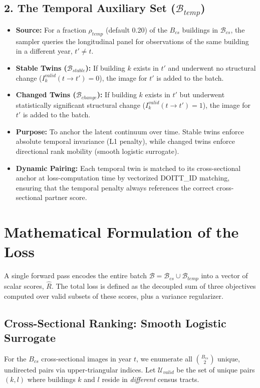 \documentclass[12pt]{article}
\begin{document}
\subsection{2. The Temporal Auxiliary Set ($\mathcal{B}_{temp}$)}
\begin{itemize}
    \item \textbf{Source:} For a fraction $\rho_{temp}$ (default 0.20) of the $B_{cs}$ buildings in $\mathcal{B}_{cs}$, the sampler queries the longitudinal panel for observations of the same building in a different year, $t' \neq t$.
    \item \textbf{Stable Twins ($\mathcal{B}_{stable}$):} If building $k$ exists in $t'$ and underwent no structural change ($I_{k}^{valid}(t \to t') = 0$), the image for $t'$ is added to the batch.
    \item \textbf{Changed Twins ($\mathcal{B}_{change}$):} If building $k$ exists in $t'$ but underwent statistically significant structural change ($I_{k}^{valid}(t \to t') = 1$), the image for $t'$ is added to the batch.
    \item \textbf{Purpose:} To anchor the latent continuum over time. Stable twins enforce absolute temporal invariance (L1 penalty), while changed twins enforce directional rank mobility (smooth logistic surrogate).
    \item \textbf{Dynamic Pairing:} Each temporal twin is matched to its cross-sectional anchor at loss-computation time by vectorized DOITT\_ID matching, ensuring that the temporal penalty always references the correct cross-sectional partner score.
\end{itemize}

\section{Mathematical Formulation of the Loss}

A single forward pass encodes the entire batch $\mathcal{B} = \mathcal{B}_{cs} \cup \mathcal{B}_{temp}$ into a vector of scalar scores, $\hat{R}$. The total loss is defined as the decoupled sum of three objectives computed over valid subsets of these scores, plus a variance regularizer.

\subsection{Cross-Sectional Ranking: Smooth Logistic Surrogate}

For the $B_{cs}$ cross-sectional images in year $t$, we enumerate all $\binom{B_{cs}}{2}$ unique, undirected pairs via upper-triangular indices. Let $\mathcal{U}_{valid}$ be the set of unique pairs $(k, l)$ where buildings $k$ and $l$ reside in \textit{different} census tracts.
\end{document}
